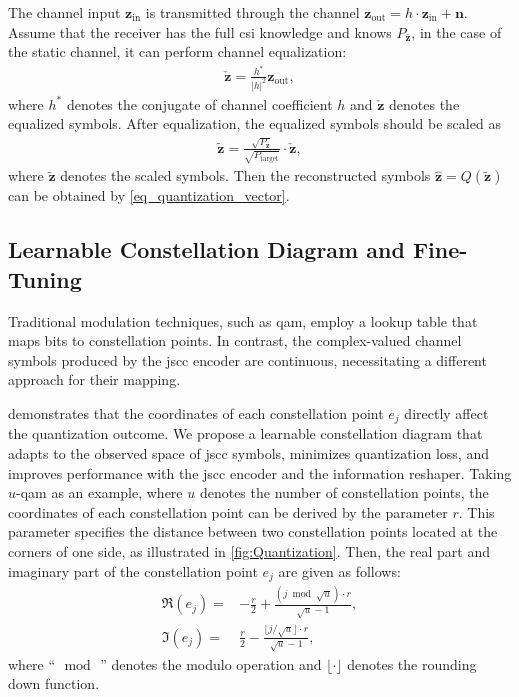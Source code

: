 The channel input $\bm{z}_\text{in}$ is transmitted through the channel $\bm{z}_{\text{out}} = h\cdot\bm{z}_{\text{in}} + \bm{n}$.
Assume that the receiver has the full \gls{csi} knowledge and knows $P_{\bar{\bm{z}}}$, in the case of the static channel, it can perform channel equalization:
\begin{align}
    \check{\bm{z}} = \frac{h^*}{|h|^2}\bm{z}_{\text{out}},
\end{align}
where $h^*$ denotes the conjugate of channel coefficient $h$ and $\check{\bm{z}}$ denotes the equalized symbols.  After equalization, the equalized symbols should be scaled as
\begin{align}
    \tilde{\bm{z}} = \frac{\sqrt{P_{\bar{\bm{z}}}}}{\sqrt{P_{\text{target}}}}\cdot\check{\bm{z}},
\end{align}
where $\tilde{\bm{z}}$ denotes the scaled symbols. Then the reconstructed symbols $\hat{\bm{z}}=Q(\tilde{\bm{z}})$ can be obtained by \cref{eq_quantization_vector}.

\subsection{Learnable Constellation Diagram and Fine-Tuning}
\label{subsec:constellation}
Traditional modulation techniques, such as \gls{qam}, employ a lookup table that maps bits to constellation points. In contrast, the complex-valued channel symbols produced by the \gls{jscc} encoder are continuous, necessitating a different approach for their mapping.

 demonstrates that the coordinates of each constellation point $e_j$ directly affect the quantization outcome. We propose a learnable constellation diagram that adapts to the observed space of \gls{jscc} symbols, minimizes quantization loss, and improves performance with the \gls{jscc} encoder and the information reshaper. Taking $u$-\gls{qam} as an example, where $u$ denotes the number of constellation points, the coordinates of each constellation point can be derived by the parameter $r$. This parameter specifies the distance between two constellation points located at the corners of one side, as illustrated in \cref{fig:Quantization}. Then, the real part and imaginary part of the constellation point \(e_j\) are given as follows:
\begin{align}
\Re(e_{j})=&-\frac{r}{2}+\frac{(j\bmod\sqrt{u})\cdot r}{\sqrt{u}-1}, \\
\Im(e_{j})=&\frac{r}{2}-\frac{\lfloor{j/\sqrt{u}}\rfloor\cdot r}{\sqrt{u}-1},
\end{align}
where ``\(\,\bmod\,\)'' denotes the modulo operation and $\lfloor\cdot\rfloor$ denotes the rounding down function.

